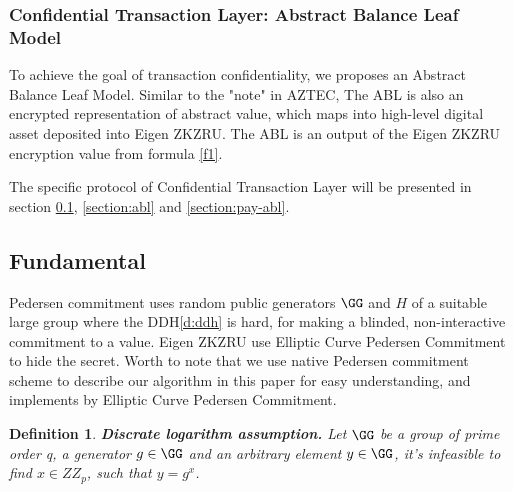 \documentclass{article}
\newtheorem{myDef}{Definition}
\begin{document}
\subsubsection{Confidential Transaction Layer: Abstract Balance Leaf Model}
To achieve the goal of transaction confidentiality, we proposes an Abstract Balance Leaf Model. Similar to the "note" in AZTEC, The ABL is also an encrypted representation of abstract value, which maps into high-level digital asset deposited into Eigen ZKZRU. The ABL is an output of the Eigen ZKZRU encryption value from formula \ref{f1}. 

The specific protocol of Confidential Transaction Layer will be presented in section \ref{section:fundanmental}, \ref{section:abl} and \ref{section:pay-abl}.

\subsection{Fundamental} \label{section:fundanmental}

Pedersen commitment \cite{pedersen1991non} uses random public generators $\GG$ and $H$ of a suitable large group where the DDH\ref{d:ddh} is hard, for making a blinded, non-interactive commitment to a value. Eigen ZKZRU use Elliptic Curve Pedersen Commitment to hide the secret. Worth to note that we use native Pedersen commitment scheme to describe our algorithm in this paper for easy understanding, and implements by Elliptic Curve Pedersen Commitment.

\begin{myDef}
\label{d:dla}
\textbf{Discrate logarithm assumption.} Let $\GG$ be a group of prime order q, a generator $g \in \GG$ and an arbitrary element $y \in \GG$, it's infeasible to find $x \in ZZ_p$, such that $y = g^x$.
\end{myDef}
\end{document}
